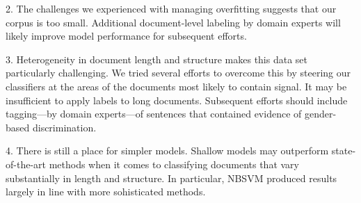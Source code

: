 \documentclass[twocolumn,10pt]{wmrDoc}
\begin{document}
2. The challenges we experienced with managing overfitting suggests that our corpus is too small.  Additional document-level labeling by domain experts will likely improve model performance for subsequent efforts.

3. Heterogeneity in document length and structure makes this data set particularly challenging.  We tried several efforts to overcome this by steering our classifiers at the areas of the documents most likely to contain signal.  It may be insufficient to apply labels to long documents.  Subsequent efforts should include tagging---by domain experts---of sentences that contained evidence of gender-based discrimination.

4. There is still a place for simpler models.   Shallow models may outperform state-of-the-art methods when it comes to classifying documents that vary substantially in length and structure.  In particular, NBSVM produced results largely in line with more sohisticated methods.






  
\end{document}
